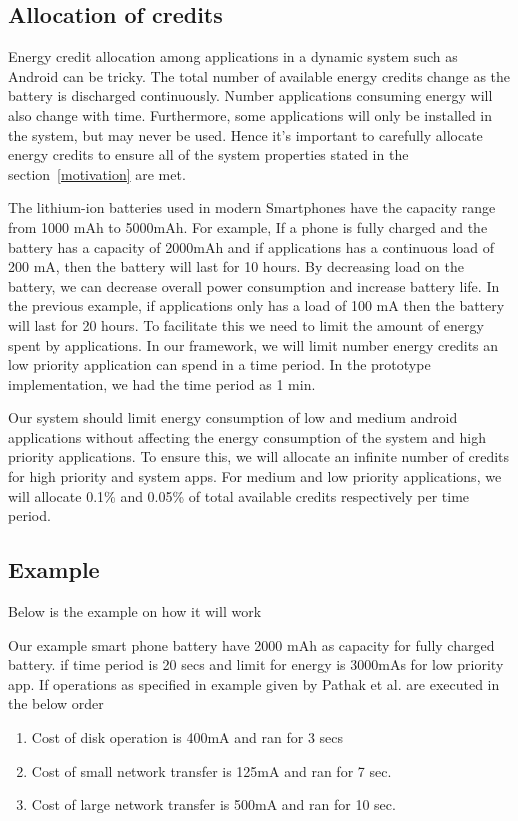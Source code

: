 \subsection{ Allocation of credits }

Energy credit allocation among applications in a dynamic system such as Android can be tricky. The total number of available energy credits change as the battery is discharged continuously. Number applications consuming energy will also change with time. Furthermore, some applications will only be installed in the system, but may never be used. Hence it's important to carefully allocate energy credits to ensure all of the system properties stated in the section~\ref{motivation}  are met.

The lithium-ion batteries used in modern Smartphones have the capacity range from 1000 mAh to 5000mAh. For example, If a phone is fully charged and the battery has a capacity of 2000mAh and if applications has a continuous load of 200 mA, then the battery will last for 10 hours. By decreasing load on the battery, we can decrease overall power consumption and increase battery life. In the previous example, if applications only has a load of 100 mA then the battery will last for 20 hours.  To facilitate this we need to limit the amount of energy spent by applications. In our framework, we will limit number energy credits an low priority application can spend in a time period. In the prototype implementation, we had the time period as 1 min.

Our system should limit energy consumption of low and medium android applications without affecting the energy consumption of the system and high priority applications. To ensure this, we will allocate an infinite number of credits for high priority and system apps. For medium and low priority applications, we will allocate 0.1\% and 0.05\% of total available credits respectively per time period. 

\subsection{Example}
Below is the example on how it will work

Our example smart phone battery have 2000 mAh as capacity for fully charged battery. if time period is 20 secs and limit for energy is 3000mAs for low priority app. If operations as specified in example given by Pathak et al. are executed in the below order

\begin{enumerate}
\item Cost of disk operation is 400mA and ran for 3 secs
\item Cost of small network transfer is 125mA and ran for 7 sec.
\item Cost of large network transfer is 500mA and ran for 10 sec.
\end{enumerate}

